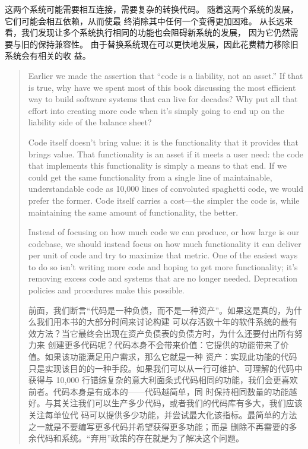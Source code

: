 \documentclass[10pt,a4paper,UTF8]{ctexart}
\begin{document}
这两个系统可能需要相互连接，需要复杂的转换代码。 随着这两个系统的发展，它们可能会相互依赖，从而使最
终消除其中任何一个变得更加困难。 从长远来看，我们发现让多个系统执行相同的功能也会阻碍新系统的发展，
因为它仍然需要与旧的保持兼容性。 由于替换系统现在可以更快地发展，因此花费精力移除旧系统会有相关的收
益。

\begin{quote}
Earlier we made the assertion that “code is a liability, not an asset.” If that is true, why have we
spent most of this book discussing the most efficient way to build software systems that can live
for decades? Why put all that effort into creating more code when it’s simply going to end up on the
liability side of the balance sheet?

Code itself doesn’t bring value: it is the functionality that it provides that brings value. That
functionality is an asset if it meets a user need: the code that implements this functionality is
simply a means to that end. If we could get the same functionality from a single line of
maintainable, understandable code as 10,000 lines of convoluted spaghetti code, we would prefer the
former. Code itself carries a cost—the simpler the code is, while maintaining the same amount of
functionality, the better.

Instead of focusing on how much code we can produce, or how large is our codebase, we should instead
focus on how much functionality it can deliver per unit of code and try to maximize that metric. One
of the easiest ways to do so isn’t writing more code and hoping to get more functionality; it’s
removing excess code and systems that are no longer needed. Deprecation policies and procedures make
this possible.

前面，我们断言“代码是一种负债，而不是一种资产”。如果这是真的，为什么我们用本书的大部分时间来讨论构建
可以存活数十年的软件系统的最有效方法？当它最终会出现在资产负债表的负债方时，为什么还要付出所有努力来
创建更多代码呢？代码本身不会带来价值：它提供的功能带来了价值。如果该功能满足用户需求，那么它就是一种
资产：实现此功能的代码只是实现该目的的一种手段。如果我们可以从一行可维护、可理解的代码中获得与
10,000 行错综复杂的意大利面条式代码相同的功能，我们会更喜欢前者。代码本身是有成本的——代码越简单，同
时保持相同数量的功能越好。与其关注我们可以生产多少代码，或者我们的代码库有多大，我们应该关注每单位代
码可以提供多少功能，并尝试最大化该指标。最简单的方法之一就是不要编写更多代码并希望获得更多功能；而是
删除不再需要的多余代码和系统。“弃用”政策的存在就是为了解决这个问题。
\end{quote}
\end{document}
